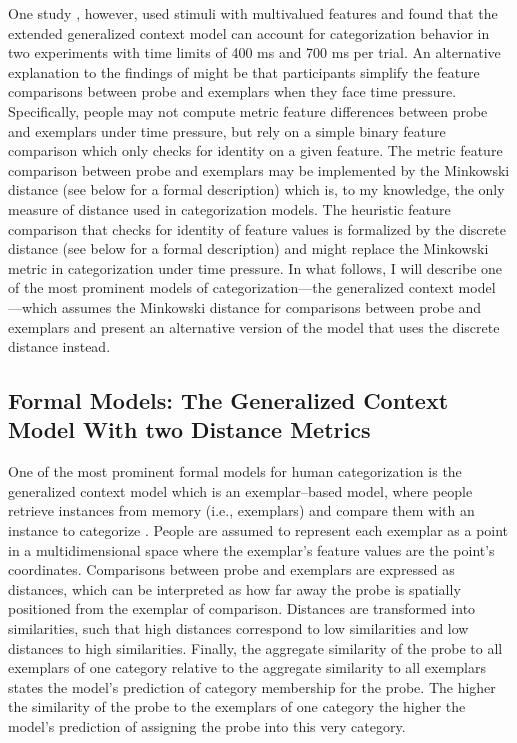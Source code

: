 \documentclass[a4paper,man,natbib]{apa6}
\begin{document}
One study \citep{lamberts1997fast}, however, used stimuli with multivalued features and found that the extended generalized context model can account for categorization behavior in two experiments with time limits of 400 ms and 700 ms per trial. An alternative explanation to the findings of \cite{lamberts1995categorization} might be that participants simplify the feature comparisons between probe and exemplars when they face time pressure. Specifically, people may not compute metric feature differences between probe and exemplars under time pressure, but rely on a simple binary feature comparison which only checks for identity on a given feature. The metric feature comparison between probe and exemplars may be implemented by the Minkowski distance (see below for a formal description) which is, to my knowledge, the only measure of distance used in categorization models. The heuristic feature comparison that checks for identity of feature values is formalized by the discrete distance (see below for a formal description) and might replace the Minkowski metric in categorization under time pressure. In what follows, I will describe one of the most prominent models of categorization---the generalized context model \citep{nosofsky1986attention}---which assumes the Minkowski distance for comparisons between probe and exemplars and present an alternative version of the model that uses the discrete distance instead.

\subsection{Formal Models: The Generalized Context Model With two Distance Metrics}
One of the most prominent formal models for human categorization is the generalized context model \citep{nosofsky1984choice, nosofsky1986attention, nosofsky2011generalized} which is an exemplar--based model, where people retrieve instances from memory (i.e., exemplars) and compare them with an instance to categorize \citep[i.e., the probe;][]{medin1978context}. People are assumed to represent each exemplar as a point in a multidimensional space where the exemplar's feature values are the point's coordinates. Comparisons between probe and exemplars are expressed as distances, which can be interpreted as how far away the probe is spatially positioned from the exemplar of comparison. Distances are transformed into similarities, such that high distances correspond to low similarities and low distances to high similarities. Finally, the aggregate similarity of the probe to all exemplars of one category relative to the aggregate similarity to all exemplars states the model's prediction of category membership for the probe. The higher the similarity of the probe to the exemplars of one category the higher the model's prediction of assigning the probe into this very category. 
\end{document}
